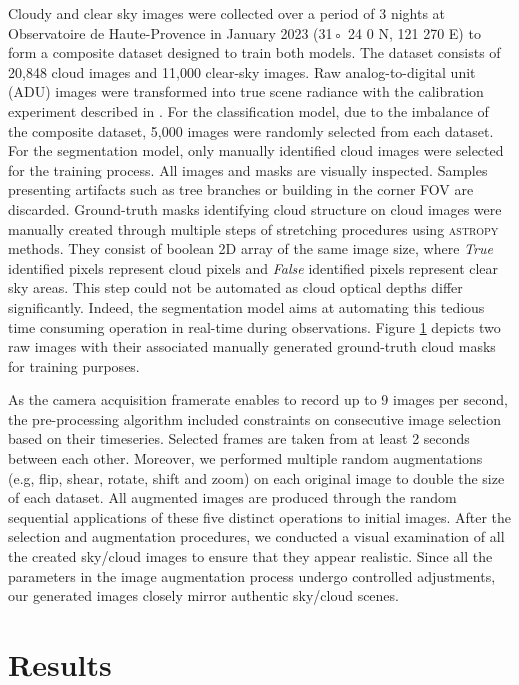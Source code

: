 \documentclass[remotesensing,article,submit,pdftex,moreauthors]{Definitions/mdpi}
\begin{document}
Cloudy and clear sky images were collected over a period of 3 nights at Observatoire de Haute-Provence in January 2023 (31◦ 24 0 N, 121 270 E) to form a composite dataset designed to train both models. The dataset consists of 20,848 cloud images and 11,000 clear-sky images. Raw analog-to-digital unit (ADU) images were transformed into true scene radiance with the calibration experiment described in \cite{}.
For the classification model, due to the imbalance of the composite dataset, 5,000 images were randomly selected from each dataset. For the segmentation model, only manually identified cloud images were selected for the training process. All images and masks are visually inspected. Samples presenting artifacts such as tree branches or building in the corner FOV are discarded. Ground-truth masks identifying cloud structure on cloud images were manually created through multiple steps of stretching procedures using \textsc{astropy} methods. They consist of boolean 2D array of the same image size, where \textit{True} identified pixels represent cloud pixels and \textit{False} identified pixels represent clear sky areas. This step could not be automated as cloud optical depths differ significantly. Indeed, the segmentation model aims at automating this tedious time consuming operation in real-time during observations. Figure \ref{} depicts two raw images with their associated manually generated ground-truth cloud masks for training purposes.

As the camera acquisition framerate enables to record up to 9 images per second, the pre-processing algorithm included constraints on consecutive image selection based on their timeseries. Selected frames are taken from at least 2 seconds between each other. Moreover, we performed multiple random augmentations (e.g, flip, shear, rotate, shift and zoom) on each original image to double the size of each dataset. All augmented images are produced through the random sequential applications of these five distinct operations to initial images. After the selection and augmentation procedures, we conducted a visual examination of all the created sky/cloud images to ensure that they appear realistic. Since all the parameters in the image augmentation process undergo controlled adjustments, our generated images closely mirror authentic sky/cloud scenes.


\section{Results}
\end{document}
